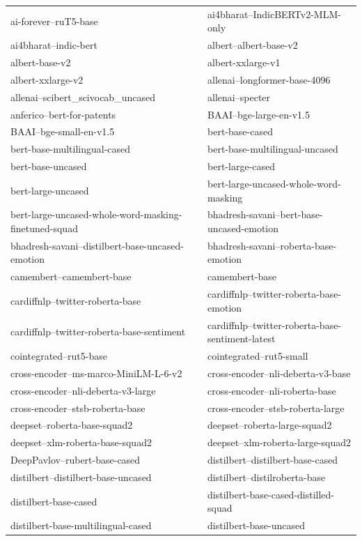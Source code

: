 \documentclass{fairmeta}
\begin{document}
\begin{longtable}{p{} p{}}
ai-forever--ruT5-base & ai4bharat--IndicBERTv2-MLM-only \\
ai4bharat--indic-bert & albert--albert-base-v2 \\
albert-base-v2 & albert-xxlarge-v1 \\
albert-xxlarge-v2 & allenai--longformer-base-4096 \\
allenai--scibert\_scivocab\_uncased & allenai--specter \\
anferico--bert-for-patents & BAAI--bge-large-en-v1.5 \\
BAAI--bge-small-en-v1.5 & bert-base-cased \\
bert-base-multilingual-cased & bert-base-multilingual-uncased \\
bert-base-uncased & bert-large-cased \\
bert-large-uncased & bert-large-uncased-whole-word-masking \\
bert-large-uncased-whole-word-masking-finetuned-squad & bhadresh-savani--bert-base-uncased-emotion \\
bhadresh-savani--distilbert-base-uncased-emotion & bhadresh-savani--roberta-base-emotion \\
camembert--camembert-base & camembert-base \\
cardiffnlp--twitter-roberta-base & cardiffnlp--twitter-roberta-base-emotion \\
cardiffnlp--twitter-roberta-base-sentiment & cardiffnlp--twitter-roberta-base-sentiment-latest \\
cointegrated--rut5-base & cointegrated--rut5-small \\
cross-encoder--ms-marco-MiniLM-L-6-v2 & cross-encoder--nli-deberta-v3-base \\
cross-encoder--nli-deberta-v3-large & cross-encoder--nli-roberta-base \\
cross-encoder--stsb-roberta-base & cross-encoder--stsb-roberta-large \\
deepset--roberta-base-squad2 & deepset--roberta-large-squad2 \\
deepset--xlm-roberta-base-squad2 & deepset--xlm-roberta-large-squad2 \\
DeepPavlov--rubert-base-cased & distilbert--distilbert-base-cased \\
distilbert--distilbert-base-uncased & distilbert--distilroberta-base \\
distilbert-base-cased & distilbert-base-cased-distilled-squad \\
distilbert-base-multilingual-cased & distilbert-base-uncased \\

\end{longtable}
\end{document}
